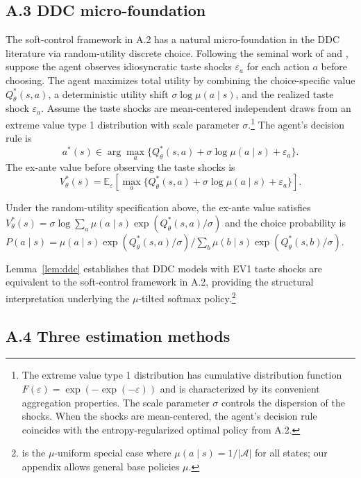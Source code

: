 \subsection*{A.3 DDC micro-foundation}
The soft-control framework in A.2 has a natural micro-foundation in the DDC literature via random-utility discrete choice. Following the seminal work of \citet{mcfadden:1973} and \citet{rust:1988}, suppose the agent observes idiosyncratic taste shocks $\varepsilon_a$ for each action $a$ before choosing. The agent maximizes total utility by combining the choice-specific value $Q^{\ast}_\theta(s,a)$, a deterministic utility shift $\sigma\log\mu(a\mid s)$, and the realized taste shock $\varepsilon_a$. Assume the taste shocks are mean-centered independent draws from an extreme value type 1 distribution with scale parameter $\sigma$.\footnote{\footnotesize The extreme value type 1 distribution has cumulative distribution function $F(\varepsilon)=\exp(-\exp(-\varepsilon))$ and is characterized by its convenient aggregation properties. The scale parameter $\sigma$ controls the dispersion of the shocks. When the shocks are mean-centered, the agent's decision rule coincides with the entropy-regularized optimal policy from A.2.} The agent's decision rule is
\[
a^{\ast}(s)\in\arg\max_a\{Q^{\ast}_\theta(s,a)+\sigma\log\mu(a\mid s)+\varepsilon_a\}.
\]
The ex-ante value before observing the taste shocks is
\[
V^{\ast}_\theta(s)=\mathbb E_\varepsilon[\max_a\{Q^{\ast}_\theta(s,a)+\sigma\log\mu(a\mid s)+\varepsilon_a\}].
\]
\begin{lemma}
\label{lem:ddc}
Under the random-utility specification above, the ex-ante value satisfies $V^{\ast}_\theta(s)=\sigma\log\sum_a \mu(a\mid s)\exp(Q^{\ast}_\theta(s,a)/\sigma)$ and the choice probability is $P(a\mid s)=\mu(a\mid s)\exp(Q^{\ast}_\theta(s,a)/\sigma)\Big/\sum_b \mu(b\mid s)\exp(Q^{\ast}_\theta(s,b)/\sigma)$.
\end{lemma}
Lemma~\ref{lem:ddc} establishes that DDC models with EV1 taste shocks are equivalent to the soft-control framework in A.2, providing the structural interpretation underlying the $\mu$-tilted softmax policy.\footnote{\footnotesize \citet{rust:1988} is the $\mu$-uniform special case where $\mu(a\mid s)=1/|\mathcal A|$ for all states; our appendix allows general base policies $\mu$.}

\subsection*{A.4 Three estimation methods}

